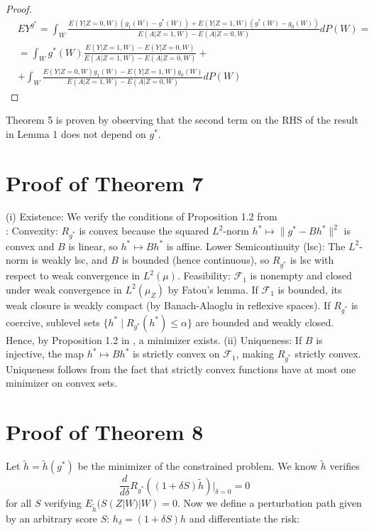 \documentclass[12pt]{article}
\theoremstyle{thmstyleone}%
\theoremstyle{thmstyletwo}%
\theoremstyle{thmstylethree}%
\begin{document}
\begin{proof}
$$\begin{aligned}&EY^{g^*} = \int_W\frac{E(Y|Z=0,W)(g_1(W) - g^*(W)) + E(Y|Z=1,W)(g^*(W) - g_0(W))}{E(A |Z=1,W) - E(A |Z=0,W)} dP(W) = \\
	&= \int_Wg^*(W)\frac{E(Y|Z=1,W)- E(Y|Z=0,W)}{E(A |Z=1,W) - E(A |Z=0,W)} + \\&+ \int_W\frac{E(Y|Z=0,W)g_1(W)- E(Y|Z=1,W)g_0(W)}{E(A |Z=1,W) - E(A |Z=0,W)}
	dP(W)\end{aligned}$$
	\end{proof}
Theorem 5 is proven by observing that the second term on the RHS of the result in Lemma 1 does not depend on $g^*$.


\section{Proof of Theorem 7}




{(i) Existence:} We verify the conditions of Proposition 1.2 from \\
\cite{Ekeland1999}: {Convexity:} $R_{g^*}$ is convex because the squared $L^2$-norm $h^* \mapsto \|g^* - B h^*\|^2$ is convex and $B$ is linear, so $h^* \mapsto B h^*$ is affine. {Lower Semicontinuity (lsc):} The $L^2$-norm is weakly lsc, and $B$ is bounded (hence continuous), so $R_{g^*}$ is lsc with respect to weak convergence in $L^2(\mu)$. Feasibility: $\mathcal{F}_1$ is nonempty and closed under weak convergence in $L^2(\mu_Z)$ by Fatou's lemma. If $\mathcal{F}_1$ is bounded, its weak closure is weakly compact (by Banach-Alaoglu in reflexive spaces). If $R_{g^*}$ is coercive, sublevel sets $\{h^* \mid R_{g^*}(h^*) \leq \alpha\}$ are bounded and weakly closed. Hence, by Proposition 1.2 in \cite{Ekeland1999}, a minimizer exists.
(ii) Uniqueness: If $B$ is injective, the map $h^* \mapsto B h^*$ is strictly convex on $\mathcal{F}_1$, making $R_{g^*}$ strictly convex. Uniqueness follows from the fact that strictly convex functions have at most one minimizer on convex sets. 

\section{Proof of Theorem 8}
Let $\tilde h = \tilde h (g^*)$ be the minimizer of the constrained problem. We know $\tilde h$ verifies $$\frac{d}{d\delta} R_{g^*}((1+\delta S) \tilde h) |_{\delta=0} = 0$$ for all $S$ verifying $E_{\tilde h}(S(Z|W) |W)=0$. Now we define a perturbation path given by an arbitrary score $S$:
$h_\delta = (1 + \delta S) h$
and differentiate the risk:
\end{document}
